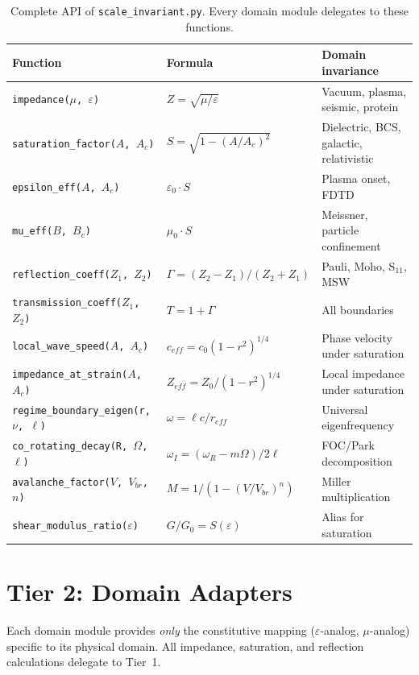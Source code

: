 \begin{table}[H]
\centering\small
\caption{Complete API of \texttt{scale\_invariant.py}.
Every domain module delegates to these functions.}
\label{tab:scale_invariant_api}
\begin{tabular}{lll}
\toprule
\textbf{Function} & \textbf{Formula} & \textbf{Domain invariance} \\
\midrule
\texttt{impedance($\mu$, $\varepsilon$)}
  & $Z = \sqrt{\mu/\varepsilon}$
  & Vacuum, plasma, seismic, protein \\
\texttt{saturation\_factor($A$, $A_c$)}
  & $S = \sqrt{1-(A/A_c)^2}$
  & Dielectric, BCS, galactic, relativistic \\
\texttt{epsilon\_eff($A$, $A_c$)}
  & $\varepsilon_0 \cdot S$
  & Plasma onset, FDTD \\
\texttt{mu\_eff($B$, $B_c$)}
  & $\mu_0 \cdot S$
  & Meissner, particle confinement \\
\texttt{reflection\_coeff($Z_1$, $Z_2$)}
  & $\Gamma = (Z_2-Z_1)/(Z_2+Z_1)$
  & Pauli, Moho, S$_{11}$, MSW \\
\texttt{transmission\_coeff($Z_1$, $Z_2$)}
  & $T = 1 + \Gamma$
  & All boundaries \\
\texttt{local\_wave\_speed($A$, $A_c$)}
  & $c_{eff} = c_0 (1-r^2)^{1/4}$
  & Phase velocity under saturation \\
\texttt{impedance\_at\_strain($A$, $A_c$)}
  & $Z_{eff} = Z_0 / (1-r^2)^{1/4}$
  & Local impedance under saturation \\
\texttt{regime\_boundary\_eigen(r, $\nu$, $\ell$)}
  & $\omega = \ell c / r_{eff}$
  & Universal eigenfrequency \\
\texttt{co\_rotating\_decay(R, $\Omega$, $\ell$)}
  & $\omega_I = (\omega_R - m\Omega) / 2\ell$
  & FOC/Park decomposition \\
\texttt{avalanche\_factor($V$, $V_{br}$, $n$)}
  & $M = 1/(1-(V/V_{br})^n)$
  & Miller multiplication \\
\texttt{shear\_modulus\_ratio($\varepsilon$)}
  & $G/G_0 = S(\varepsilon)$
  & Alias for saturation \\
\bottomrule
\end{tabular}
\end{table}


\section{Tier 2: Domain Adapters}
\label{sec:tier2_adapters}

Each domain module provides \emph{only} the constitutive mapping
($\varepsilon$-analog, $\mu$-analog) specific to its physical
domain.  All impedance, saturation, and reflection calculations
delegate to Tier~1.

